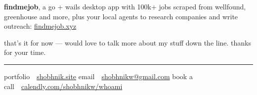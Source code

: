 \documentclass[10pt,a4paper]{article}
\newcommand{\lnk}[2]{\href{#1}{#2}}
\newcommand{\hr}{{\color{rulegray}\rule{\linewidth}{0.6pt}}}
\begin{document}
\textbf{findmejob}, a go + wails desktop app with 100k+ jobs scraped from wellfound, greenhouse and more, plus your local agents to research companies and write outreach: \lnk{https://findmejob.xyz}{findmejob.xyz}

that's it for now --- would love to talk more about my stuff down the line. thanks for your time.

\vspace{2pt}
\hr
\vspace{-4pt}

{\color{muted}portfolio}\ \ \lnk{https://shobhnik.site}{shobhnik.site}\qquad
{\color{muted}email}\ \ \lnk{mailto:shobhnikw@gmail.com}{shobhnikw@gmail.com}\qquad
{\color{muted}book a call}\ \ \lnk{https://calendly.com/shobhnikw/whoami}{calendly.com/shobhnikw/whoami}
\end{document}
